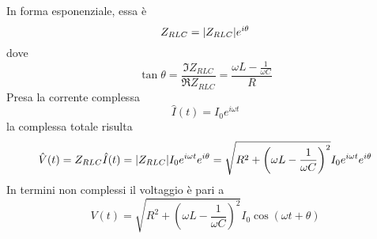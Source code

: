 In forma esponenziale, essa è
\begin{equation*}
	Z_{RLC}=\abs{Z_{RLC}}e^{i\theta}
\end{equation*}
dove
\begin{equation*}
	\tan\theta=\frac{\Im Z_{RLC}}{\Re Z_{RLC}}=\frac{\omega L -\frac{1}{\omega C}}{R}
\end{equation*}
Presa la corrente complessa
\begin{equation*}
	\hat{I}(t)=I_0e^{i\omega t}
\end{equation*}
la \ddp complessa totale risulta
\begin{equation*}
	\hat{V}(t)=Z_{RLC}\hat{I}(t)=\abs{Z_{RLC}}I_0e^{i\omega t}e^{i\theta}=\sqrt{R^2+\left(\omega L-\frac{1}{\omega C}\right)^2}I_0e^{i\omega t}e^{i\theta}
\end{equation*}
In termini non complessi il voltaggio è pari a
\begin{equation*}
	V(t)=\sqrt{R^2+\left(\omega L-\frac{1}{\omega C}\right)^2}I_0\cos(\omega t +\theta)
\end{equation*}
